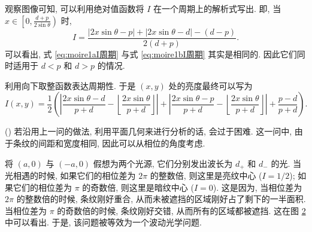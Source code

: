 \documentclass{article}
\newcounter{para}
\newcommand\mypara{\par\refstepcounter{para}(\thepara)\space}
\begin{document}
\begin{figure}[h!]
	\centering
	\caption{}
	\label{fig:moire1bgraph}
\end{figure}

观察图像可知, 可以利用绝对值函数将 $I$ 在一个周期上的解析式写出.
即, 当 $x\in\left[0,\frac{d+p}{2\sin\theta}\right)$ 时,
\begin{equation}
	\label{eq:moire1bI周期}
	I=\frac{\left|2x\sin\theta-p\right|+\left|2x\sin\theta-d\right|-\left(d-p\right)}
	{2\left(d+p\right)}.
\end{equation}
可以看出, 式 \ref{eq:moire1aI周期} 与式 \ref{eq:moire1bI周期} 其实是相同的.
因此它们同时适用于 $d<p$ 和 $d>p$ 的情况.

利用向下取整函数表达周期性.
于是 $\left(x,y\right)$ 处的亮度最终可以写为
\begin{equation}
	I\!\left(x,y\right)=\frac12\left(\left|
		\frac{2x\sin\theta-d}{p+d}-\left\lfloor\frac{2x\sin\theta}{p+d}\right\rfloor
	\right|+\left|
		\frac{2x\sin\theta-p}{p+d}-\left\lfloor\frac{2x\sin\theta}{p+d}\right\rfloor
	\right|+\frac{p-d}{p+d}\right).
\end{equation}

\mypara
若沿用上一问的做法, 利用平面几何来进行分析的话, 会过于困难.
这一问中, 由于条纹的间距和宽度相同, 因此可以从相位的角度考虑.

将 $\left(a,0\right)$ 与 $\left(-a,0\right)$ 假想为两个光源,
它们分别发出波长为 $d_+$ 和 $d_-$ 的光.
当光相遇的时候, 如果它们的相位差为 $2\pi$ 的整数倍, 则这里是亮纹中心 ($I=1/2$);
如果它们的相位差为 $\pi$ 的奇数倍, 则这里是暗纹中心 ($I=0$).
这是因为, 当相位差为 $2\pi$ 的整数倍的时候, 条纹刚好重合, 从而未被遮挡的区域刚好占了剩下的一半面积.
当相位差为 $\pi$ 的奇数倍的时候, 条纹刚好交错, 从而所有的区域都被遮挡.
这在图 \ref{fig:moire2} 中可以看出.
于是, 该问题被等效为一个波动光学问题.

\begin{figure}[h!]
	\centering
	\caption{}
	\label{fig:moire2}
\end{figure}
\end{document}

